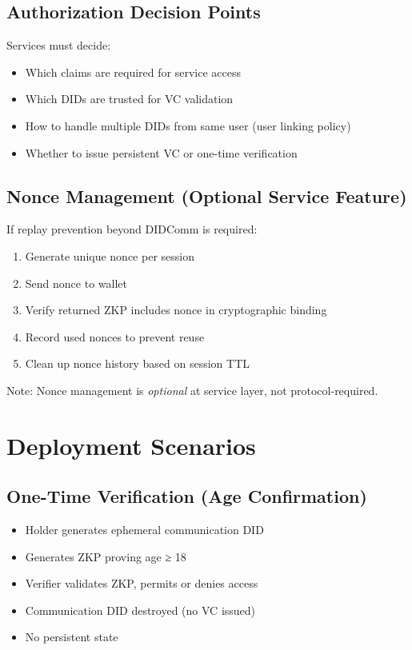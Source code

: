 \subsection{Authorization Decision Points}

Services must decide:

\begin{itemize}
  \item Which claims are required for service access
  \item Which DIDs are trusted for VC validation
  \item How to handle multiple DIDs from same user (user linking policy)
  \item Whether to issue persistent VC or one-time verification
\end{itemize}

\subsection{Nonce Management (Optional Service Feature)}

If replay prevention beyond DIDComm is required:

\begin{enumerate}
  \item Generate unique nonce per session
  \item Send nonce to wallet
  \item Verify returned ZKP includes nonce in cryptographic binding
  \item Record used nonces to prevent reuse
  \item Clean up nonce history based on session TTL
\end{enumerate}

Note: Nonce management is \emph{optional} at service layer, not protocol-required.

\section{Deployment Scenarios}

\subsection{One-Time Verification (Age Confirmation)}

\begin{itemize}
  \item Holder generates ephemeral communication DID
  \item Generates ZKP proving age ≥ 18
  \item Verifier validates ZKP, permits or denies access
  \item Communication DID destroyed (no VC issued)
  \item No persistent state
\end{itemize}


